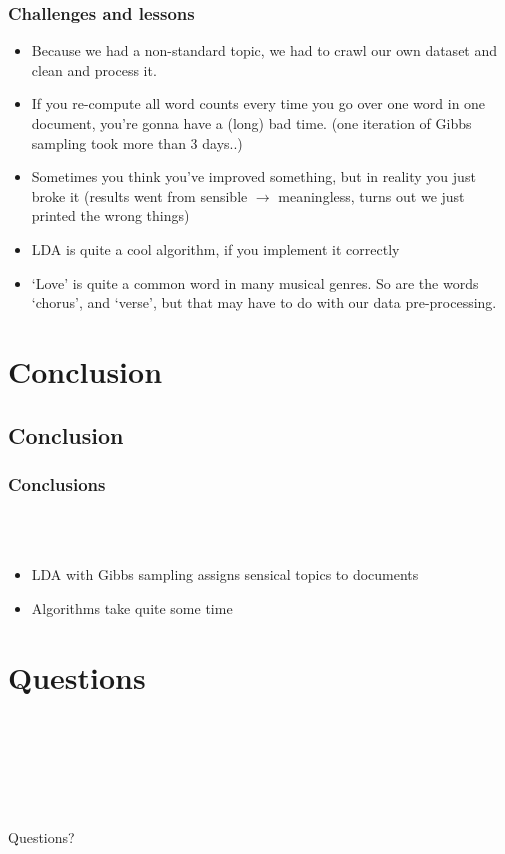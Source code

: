 \documentclass[t,ignorenonframetext]{beamer}
\begin{document}
\begin{frame}
\frametitle{Challenges and lessons}
\begin{itemize}
	\item Because we had a non-standard topic, we had to crawl our own dataset and clean and process it.
	\item If you re-compute all word counts every time you go over one word in one document, you're gonna have a (long) bad time. (one iteration of Gibbs sampling took more than 3 days..)
	\item Sometimes you think you've improved something, but in reality you just broke it (results went from sensible $\rightarrow$ meaningless, turns out we just printed the wrong things)
	\item LDA is quite a cool algorithm, if you implement it correctly
	\item `Love' is quite a common word in many musical genres. So are the words `chorus', and `verse', but that may have to do with our data pre-processing.
\end{itemize}
\end{frame}

\section{Conclusion}
\subsection{Conclusion}
\begin{frame}
\frametitle{Conclusions}~\\~\\
\begin{itemize}
\setlength{\itemsep}{10pt}\setlength{\itemsep}{5pt}
\item LDA with Gibbs sampling assigns sensical topics to documents
\item Algorithms take quite some time

\end{itemize}
\end{frame}

\section[Questions]{Questions}
\begin{frame}
~ \\~ \\~ \\ ~ \\~ \\
\begin{center}\Huge Questions? \end{center} 
\end{frame}
\end{document}
